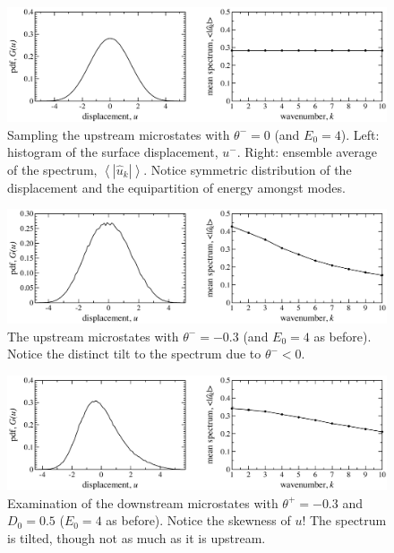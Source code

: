 \documentclass[12pt]{article}
\newcommand{\abs}[1]{\left| #1 \right|}
\newcommand{\mean}[1]{\left< #1 \right>}
\newcommand{\uhat}{\hat{u}}
\begin{document}
\begin{figure}[p]%
\begin{center}
\includegraphics[width = 0.8 \textwidth]{microup0}
\caption{Sampling the upstream microstates with $\theta^- = 0$ (and $E_0 = 4$). Left: histogram of the surface displacement, $u^-$. Right: ensemble average of the spectrum, $\mean{\abs{\uhat_k}}$. Notice symmetric distribution of the displacement and the equipartition of energy amongst modes.}
\label{microup0}
\end{center}
\end{figure}
 
\begin{figure}[p]%
\begin{center}
\includegraphics[width = 0.8 \textwidth]{microup3}
\caption{The upstream microstates with $\theta^- = -0.3$ (and $E_0 = 4$ as before). Notice the distinct tilt to the spectrum due to $\theta^- < 0$.}
\label{microup3}
\end{center}
\end{figure}
 
\begin{figure}[p]%
\begin{center}
\includegraphics[width = 0.8 \textwidth]{microdn3}
\caption{Examination of the downstream microstates with $\theta^+ = -0.3$ and $D_0 = 0.5$ ($E_0 = 4$ as before). Notice the skewness of $u$! The spectrum is tilted, though not as much as it is upstream.}
\label{microdn3}
\end{center}
\end{figure}
 
\end{document}
